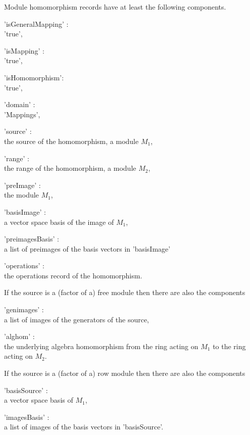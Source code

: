 
Module homomorphism records have at least the following components.

'isGeneralMapping' : \\
    'true',

'isMapping' : \\
    'true',

'isHomomorphism': \\
    'true',

'domain' : \\
    'Mappings',

'source' : \\
    the source of the homomorphism, a module $M_1$,

'range' : \\
    the range of the homomorphism, a module $M_2$,

'preImage' : \\
    the module $M_1$,

'basisImage' : \\
    a vector space basis of the image of $M_1$,

'preimagesBasis' : \\
    a list of preimages of the basis vectors in 'basisImage'

'operations' : \\
    the operations record of the homomorphism.

If the source is a (factor of a) free module then there are also the
components

'genimages' : \\
    a list of images of the generators of the source,

'alghom' : \\
    the underlying algebra homomorphism from the ring acting on $M_1$
    to the ring acting on $M_2$.

If the source is a (factor of a) row module then there are also the
components

'basisSource' : \\
    a vector space basis of $M_1$,

'imagesBasis' : \\
    a list of images of the basis vectors in 'basisSource'.

